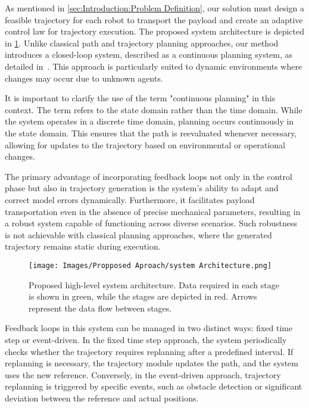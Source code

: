 As mentioned in \ref{sec:Introduction:Problem Definition}, our solution must design a feasible trajectory for each robot to transport the payload and create an adaptive control law for trajectory execution. The proposed system architecture is depicted in \ref{fig:Proposed Approach: System Architecture : System Architecture}. Unlike classical path and trajectory planning approaches, our method introduces a closed-loop system, described as a continuous planning system, as detailed in~\cite{durfee1999survey}. This approach is particularly suited to dynamic environments where changes may occur due to unknown agents. 

It is important to clarify the use of the term "continuous planning" in this context. The term refers to the state domain rather than the time domain. While the system operates in a discrete time domain, planning occurs continuously in the state domain. This ensures that the path is reevaluated whenever necessary, allowing for updates to the trajectory based on environmental or operational changes.

The primary advantage of incorporating feedback loops not only in the control phase but also in trajectory generation is the system's ability to adapt and correct model errors dynamically. Furthermore, it facilitates payload transportation even in the absence of precise mechanical parameters, resulting in a robust system capable of functioning across diverse scenarios. Such robustness is not achievable with classical planning approaches, where the generated trajectory remains static during execution.

\begin{figure}[H]
    \centering
    \texttt{[image: Images/Propposed Aproach/system Architecture.png]}
    \caption{Proposed high-level system architecture. Data required in each stage is shown in green, while the stages are depicted in red. Arrows represent the data flow between stages.}
    \label{fig:Proposed Approach: System Architecture : System Architecture}
\end{figure}

Feedback loops in this system can be managed in two distinct ways: fixed time step or event-driven. In the fixed time step approach, the system periodically checks whether the trajectory requires replanning after a predefined interval. If replanning is necessary, the trajectory module updates the path, and the system uses the new reference. Conversely, in the event-driven approach, trajectory replanning is triggered by specific events, such as obstacle detection or significant deviation between the reference and actual positions.

